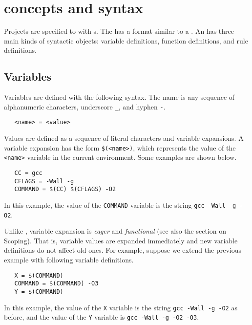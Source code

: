 %
\chapter{\OMake{} concepts and syntax}
\label{chapter:language}

Projects are specified to  with s.  The  has a format
similar to a .  An  has three main kinds of syntactic objects:
variable definitions, function definitions, and rule definitions.

\section{Variables}
\label{section:variables}

Variables are defined with the following syntax.  The name is any sequence of alphanumeric
characters, underscore \verb+_+, and hyphen \verb+-+.

\begin{verbatim}
   <name> = <value>
\end{verbatim}

Values are defined as a sequence of literal characters and variable expansions.  A variable
expansion has the form \verb+$(<name>)+, which represents the value of the \verb+<name>+
variable in the current environment.  Some examples are shown below.

\begin{verbatim}
   CC = gcc
   CFLAGS = -Wall -g
   COMMAND = $(CC) $(CFLAGS) -O2
\end{verbatim}

In this example, the value of the \verb+COMMAND+ variable is the string \verb+gcc -Wall -g -O2+.

Unlike , variable expansion is \emph{eager} and \emph{functional} (see also the section
on Scoping).  That is, variable values are expanded immediately and new variable definitions do not
affect old ones.  For example, suppose we extend the previous example with following variable
definitions.

\begin{verbatim}
   X = $(COMMAND)
   COMMAND = $(COMMAND) -O3
   Y = $(COMMAND)
\end{verbatim}

In this example, the value of the \verb+X+ variable is the string \verb+gcc -Wall -g -O2+ as
before, and the value of the \verb+Y+ variable is \verb+gcc -Wall -g -O2 -O3+.

